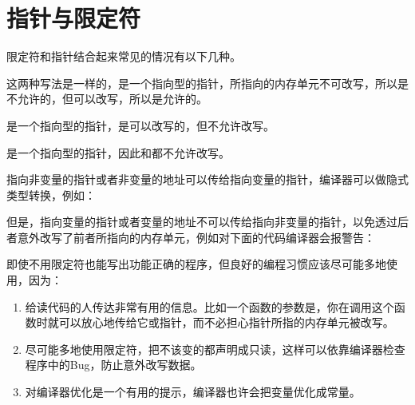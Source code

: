 
\section{指针与限定符}
%
限定符和指针结合起来常见的情况有以下几种。




这两种写法是一样的，是一个指向型的指针，所指向的内存单元不可改写，所以是不允许的，但可以改写，所以是允许的。




是一个指向型的指针，是可以改写的，但不允许改写。




是一个指向型的指针，因此和都不允许改写。



指向非变量的指针或者非变量的地址可以传给指向变量的指针，编译器可以做隐式类型转换，例如：




但是，指向变量的指针或者变量的地址不可以传给指向非变量的指针，以免透过后者意外改写了前者所指向的内存单元，例如对下面的代码编译器会报警告：




即使不用限定符也能写出功能正确的程序，但良好的编程习惯应该尽可能多地使用，因为：


\begin{enumerate}

\item {}给读代码的人传达非常有用的信息。比如一个函数的参数是，你在调用这个函数时就可以放心地传给它或指针，而不必担心指针所指的内存单元被改写。

\item 尽可能多地使用限定符，把不该变的都声明成只读，这样可以依靠编译器检查程序中的Bug，防止意外改写数据。

\item {}对编译器优化是一个有用的提示，编译器也许会把变量优化成常量。
\end{enumerate}


